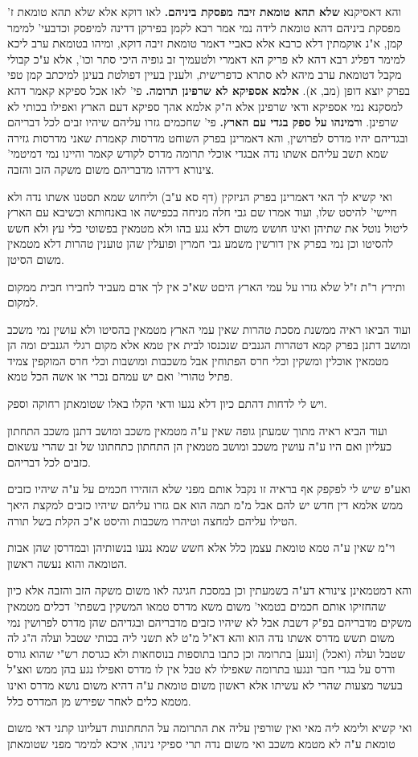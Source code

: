 \documentclass[12pt, openany]{book}
\begin{document}
{ והא דאסיקנא \textbf{שלא תהא טומאת זיבה מפסקת ביניהם.} לאו דוקא אלא שלא תהא טומאת ז' מפסקת ביניהם דהא טומאת לידה נמי אמר רבא לקמן בפירקן דדינה למיפסק וכדבעי' למימר קמן, א"נ אוקמתין דלא כרבא אלא כאביי דאמר טומאת זיבה דוקא, ומיהו בטומאת ערב ליכא למימר דפליג רבא דהא לא פריק הא דאמרי ולטעמיך זב גופיה היכי סתר וכו', אלא ע"כ קבולי מקבל דטומאת ערב מיהא לא סתרא כדפרישית, ולענין בעיין דפולטת בעינן למיכתב קמן טפי בפרק יוצא דופן (מב, א). 
\textbf{אלמא אספיקא לא שרפינן תרומה.} פי' לאו אכל ספיקא קאמר דהא למסקנא נמי אספיקא ודאי שרפינן אלא ה"ק אלמא אהך ספיקא דעם הארץ ואפילו בכותי לא שרפינן. 
\textbf{ורמינהו על ספק בגדי עם הארץ.} פי' שחכמים גזרו עליהם שיהיו זבים לכל דבריהם ובגדיהם יהיו מדרס לפרושין, והא דאמרינן בפרק השוחט מדרסות קאמרת שאני מדרסות גזירה שמא תשב עליהם אשתו נדה אבגדי אוכלי תרומה מדרס לקודש קאמר והיינו נמי דמיטמי' צינורא דידהו מדבריהם משום משקה הזב והזבה.\par ואי קשיא לך האי דאמרינן בפרק הניזקין (דף סא ע"ב) וליחוש שמא תסטנו אשתו נדה ולא חיישי' להיסט שלו, ועוד אמרו שם גבי חלה מניחה בכפישה או באנחותא וכשיבא עם הארץ ליטול נוטל את שתיהן ואינו חושש משום דלא נגע בהו ולא מטמאין בפשוטי כלי עץ ולא חשש להסיטו וכן נמי בפרק אין דורשין משמע גבי חמרין ופועלין שהן טוענין טהרות דלא מטמאין משום הסיטן.\par ותירץ ר"ת ז"ל שלא גזרו על עמי הארץ היםט שא"כ אין לך אדם מעביר לחבירו חבית ממקום למקום.\par ועוד הביאו ראיה ממשנת מסכת טהרות שאין עמי הארץ מטמאין בהסיטו ולא עושין נמי משכב ומושב דתנן בפרק קמא דטהרות הגנבים שנכנסו לבית אין טמא אלא מקום רגלי הגנבים ומה הן מטמאין אוכלין ומשקין וכלי חרס הפתוחין אבל משכבות ומושבות וכלי חרס המוקפין צמיד פתיל טהורי' ואם יש עמהם נכרי או אשה הכל טמא.\par ויש לי לדחות דהתם כיון דלא נגעו ודאי הקלו באלו שטומאתן רחוקה וספק.\par ועוד הביא ראיה מתוך שמעתן גופה שאין ע"ה מטמאין משכב ומושב דתנן משכב התחתון כעליון ואם היו ע"ה עושין משכב ומושב מטמאין הן התחתון כתחתונו של זב שהרי עשאום כזבים לכל דבריהם.\par ואע"פ שיש לי לפקפק אף בראיה זו נקבל אותם מפני שלא הזהירו חכמים על ע"ה שיהיו כזבים ממש אלמא דין חדש יש להם אבל מ"מ תמה הוא אם גזרו עליהם שיהיו כזבים למקצת היאך הטילו עליהם למחצה וטיהרו משכבות והיסט א"כ הקלת בשל תורה.\par וי"מ שאין ע"ה טמא טומאת עצמן כלל אלא חשש שמא נגעו בנשותיהן ובמדרסן שהן אבות הטומאה והוא נעשה ראשון.\par והא דמטמאינן צינורא דע"ה בשמעתין וכן במסכת חגיגה לאו משום משקה הזב והזבה אלא כיון שהחזיקו אותם חכמים בטמאי' משום משא מדרס טמאו המשקין בשפתי' דכלים מטמאין משקים מדבריהם בפ"ק דשבת אבל לא שיהיו כזבים מדבריהם ובגדיהם שהן מדרס לפרושין נמי משום תשש מדרס אשתו נדה הוא והא דא"ל מ"ט לא תשני ליה בכותי שטבל ועלה ה"ג לה שטבל ועלה (ואכל) [ונגע] בתרומה וכן כתבו בתוספות בנוסחאות ולא כגרסת רש"י שהוא גורס ודרס על בגדי חבר ונגעו בתרומה שאפילו לא טבל אין לו מדרס ואפילו נגע בהן ממש ואצ"ל בעשר מצעות שהרי לא עשיתו אלא ראשון משום טומאת ע"ה דהיא משום נושא מדרס ואינו מטמא כלים לאחר שפירש מן המדרס כלל.\par ואי קשיא ולימא ליה מאי ואין שורפין עליה את התרומה על התחתונות דעליונו קתני דאי משום טומאת ע"ה לא מטמא משכב ואי משום נדה תרי ספיקי נינהו, איכא למימר מפני שטומאתן }
\end{document}
